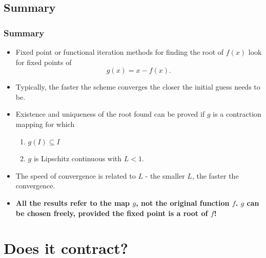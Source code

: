 \documentclass{beamer}
\begin{document}
\subsection{Summary}

\begin{frame}
  \frametitle{Summary}

  \begin{itemize}
  \item Fixed point or functional iteration methods for finding the
    root of $f(x)$ look for fixed points of
    \begin{equation*}
      g(x) = x - f(x).
    \end{equation*}
  \item Typically, the faster the scheme converges the closer the
    initial guess needs to be.
  \item Existence and uniqueness of the root found can be proved if
    $g$ is a contraction mapping for which
    \begin{enumerate}
    \item $g(I) \subseteq I$
    \item $g$ is Lipschitz continuous with $L < 1$.
    \end{enumerate}
  \item The speed of convergence is related to $L$ - the smaller $L$,
    the faster the convergence.
  \item {\bf All the results refer to the map $g$, not the original
      function $f$. $g$ can be chosen freely, provided the fixed point
      is a root of $f$!}
  \end{itemize}

\end{frame}

\section{Does it contract?}
\end{document}
